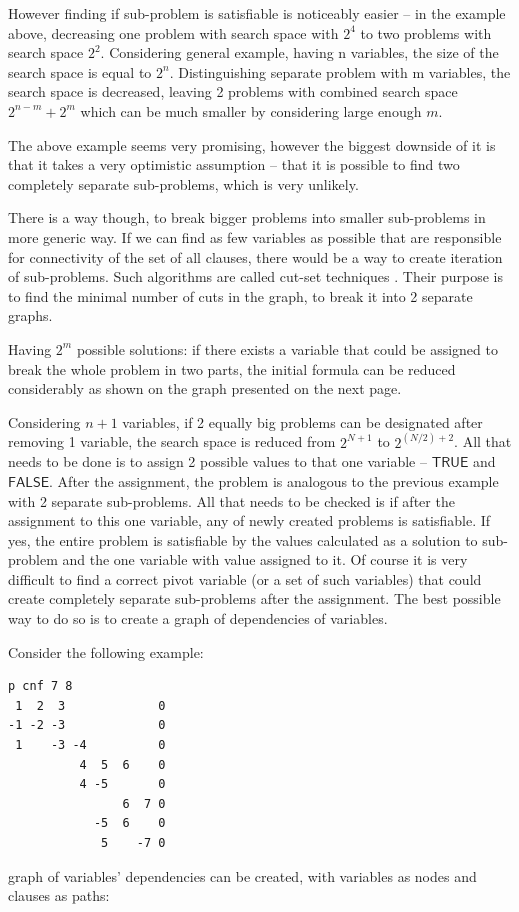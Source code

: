 \documentclass[12pt,english,pdflatex]{aghdpl}
\begin{document}
However finding if sub-problem is satisfiable
is noticeably easier -- in the example above, decreasing one problem with
search space with $2^4$ to two problems with search
space $2^2$. Considering general example, having n
variables, the size of the search space is equal to $2^{n}$. Distinguishing
separate problem with m variables, the search space is decreased, leaving
2 problems with combined search space $2^{n-m}+ 2^{m}$ which
can be much smaller by  considering large enough $m$.

The above example seems very promising, however the biggest downside of it
is that it takes a very optimistic assumption -- that it is possible
to find two completely separate sub-problems, which is very unlikely.

There is a way though, to break bigger problems into smaller sub-problems
in  more generic way. If we can find as few variables as possible
that are responsible for connectivity of the set of all clauses,
there would be a way to create iteration of sub-problems. Such algorithms
are called cut-set techniques \cite{cut-set}. Their purpose is to find the minimal number of 
cuts in the graph, to break it into 2 separate graphs.

Having $2^{m}$ possible
solutions: if there exists a variable that could be assigned to break
the whole problem in two parts, the initial formula can be reduced considerably
as shown on the graph presented on the next page.

Considering $n+1$ variables, if 2 equally big problems can be designated
after removing 1 variable, the search space is reduced from $2^{N+1}$ to
$2^{(N/2) + 2}$. All that needs to be done is to assign
2 possible values to that one variable -- $\mathsf{TRUE}$ and $\mathsf{FALSE}$. After the assignment,
the problem is analogous to the previous example with 2 separate sub-problems.
All that needs to be checked is if after the assignment to this one variable,
any of newly created problems is satisfiable. If yes, the entire problem
is satisfiable by the values calculated as a solution to sub-problem
and the one variable with value assigned to it. Of course it is very
difficult to find a correct pivot variable (or a set of such variables) that
could create completely separate sub-problems after the assignment. The
best possible way to do so is to create a graph of dependencies of variables.

Consider the  following example:

\begin{lstlisting}
p cnf 7 8
 1  2  3             0
-1 -2 -3             0
 1    -3 -4          0
          4  5  6    0
          4 -5       0
                6  7 0
            -5  6    0
             5    -7 0
\end{lstlisting}
graph of variables' dependencies can be created, with variables as
nodes and clauses as paths:
\end{document}
